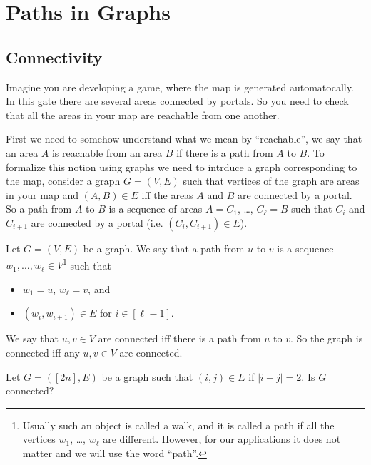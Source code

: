 \chapter{Paths in Graphs}
\section{Connectivity}
Imagine you are developing a game, where the map is generated automatocally.
In this gate there are several areas connected by portals. So you need to check
that all the areas in your map are reachable from one another.

First we need to somehow understand what we mean by ``reachable'', we say that
an area $A$ is reachable from an area $B$ if there is a path from $A$ to
$B$. To formalize this notion using graphs we need to intrduce a graph
corresponding to the map, consider a graph $G = (V, E)$ such that vertices of
the graph are areas in your map and $(A, B) \in E$ iff the areas $A$ and $B$
are connected by a portal. So a path from $A$ to $B$ is a sequence of areas
$A = C_1$, \dots, $C_\ell = B$ such that $C_i$ and $C_{i + 1}$ are connected by
a portal (i.e. $(C_i, C_{i + 1}) \in E$).
\begin{definition}
  Let $G = (V, E)$ be a graph. We say that a path from $u$ to $v$ is
  a sequence $w_1, \dots, w_\ell \in V$\footnote{%
    Usually such an object is called a walk, and it is called a path if
    all the vertices $w_1$, \dots, $w_\ell$ are different. However,
    for our applications it does not matter and we will use the word ``path''.
  } such that
  \begin{itemize}
    \item $w_1 = u$, $w_\ell = v$, and
    \item $(w_i, w_{i + 1}) \in E$ for $i \in [\ell - 1]$.
  \end{itemize}

  We say that $u, v \in V$ are connected iff there is a path from $u$ to $v$.
  So the graph is connected iff any $u, v \in V$ are connected.
\end{definition}

\begin{exercise}
  Let $G = ([2n], E)$ be a graph such that $(i, j) \in E$ if $|i - j| = 2$.
  Is $G$ connected?
\end{exercise}

